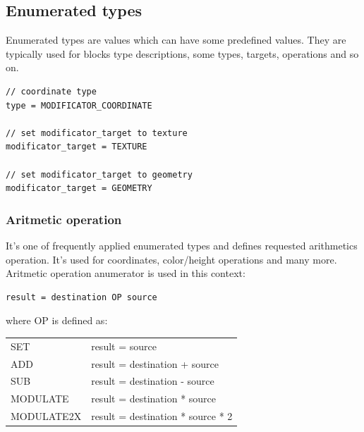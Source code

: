 \documentclass[9pt]{article}
\begin{document}
\subsection{Enumerated types}

Enumerated types are values which can have some predefined values. 
They are typically used for blocks type descriptions, some types,
targets, operations and so on.
\begin{verbatim}
// coordinate type
type = MODIFICATOR_COORDINATE

// set modificator_target to texture
modificator_target = TEXTURE

// set modificator_target to geometry
modificator_target = GEOMETRY
\end{verbatim}

\subsubsection{Aritmetic operation}
It's one of frequently applied enumerated types and defines requested arithmetics
operation. It's used for coordinates, color/height operations and many more. Aritmetic 
operation anumerator is used in this context: 
\begin{verbatim}
result = destination OP source
\end{verbatim}
where OP is defined as: 
\begin{center}
\begin{tabular}{|l||l|}
SET & result = source\\
ADD & result = destination + source\\
SUB & result = destination - source\\
MODULATE & result = destination * source\\
MODULATE2X & result = destination * source * 2\\
\end{tabular}
\end{center}
\end{document}
